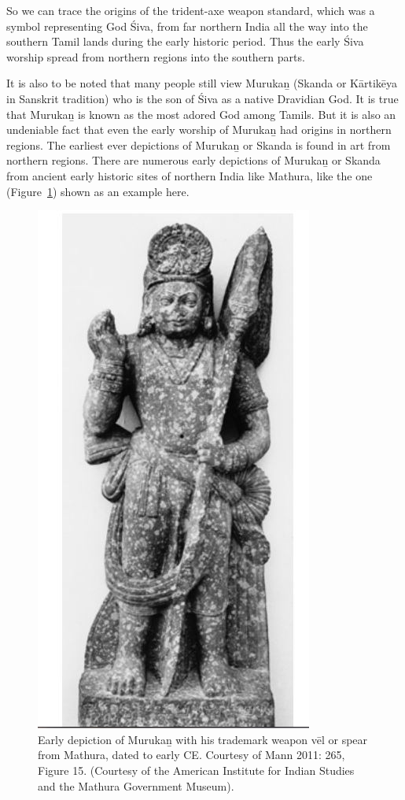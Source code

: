 So we can trace the origins of the trident-axe weapon standard, which was a symbol representing God Śiva, from far northern India all the way into the southern Tamil lands during the early historic period. Thus the early Śiva worship spread from northern regions into the southern parts.

It is also to be noted that many people still view Murukaṉ (Skanda or Kārtikēya in Sanskrit tradition) who is the son of Śiva as a native Dravidian God. It is true that Murukaṉ is known as the most adored God among Tamils. But it is also an undeniable fact that even the early worship of Murukaṉ had origins in northern regions. The earliest ever depictions of Murukaṉ or Skanda is found in art from northern regions. There are numerous early depictions of Murukaṉ or Skanda from ancient early historic sites of northern India like Mathura, like the one (Figure~\ref{art5-fig8}) shown as an example here.

\begin{figure}[!tb]
\includegraphics{"images/article-05/art05-fig08.jpg"}
\caption{Early depiction of Murukaṉ with his trademark weapon vēl or spear from Mathura, dated to early CE. Courtesy of Mann 2011: 265, Figure 15. (Courtesy of the American Institute for Indian Studies and the Mathura Government Museum).}\label{art5-fig8}
\end{figure}

